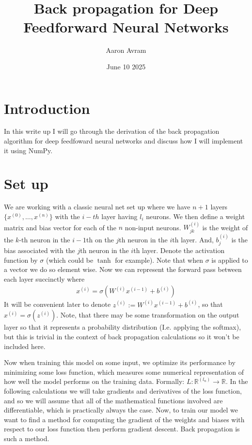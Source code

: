\documentclass[12pt]{article}
\title{Back propagation for Deep Feedforward Neural Networks}
\author{Aaron Avram}
\date{June 10 2025}
\begin{document}
\maketitle

\section*{Introduction}
In this write up I will go through the derivation of the back propagation algorithm
for deep feedfoward neural networks and discuss how I will implement it using
NumPy.

\section*{Set up}
We are working with a classic neural net set up where we have $n + 1$ layers
$\{x^{(0)}, \ldots, x^{(n)}\}$ with the $i-th$ layer having $l_i$ neurons. We then define a weight matrix and bias vector for each of the $n$ non-input neurons.
$W^{(i)}_{jk}$ is the weight of the $k$-th neuron in the $i-1$th on the $j$th neuron
in the $i$th layer. And, $b^{(i)}_j$ is the bias associated with the $j$th neuron in the 
$i$th layer. Denote the activation function by $\sigma$ (which could be $\tanh$ for example). Note that when
$\sigma$ is applied to a vector we do so element wise. Now we can represent the forward pass between each layer succinctly where
\begin{align*}
    x^{(i)} = \sigma(W^{(i)}x^{(i-1)} + b^{(i)})
\end{align*}
It will be convenient later to denote $z^{(i)} := W^{(i)}x^{(i-1)} + b^{(i)}$, so
that $x^{(i)} = \sigma(z^{(i)})$. Note, that there may be some transformation
on the output layer so that it represents a probability distribution (I.e. applying the softmax),
but this is trivial in the context of back propagation calculations so it won't be included here.


Now when training this model on some input, we optimize its performance
by minimizing some loss function, which measures some numerical representation
of how well the model performs on the training data. Formally: $L: \mathbb{R}^{(l_n)} \to \mathbb{R}$. In the
following calculations we will take gradients and derivatives of the loss function, and so we will assume
that all of the mathematical functions involved are differentiable, which is practically always the case. Now,
to train our model we want to find a method for computing the gradient of the weights and biases with respect to our loss function
then perform gradient descent. Back propagation is such a method.
\end{document}
